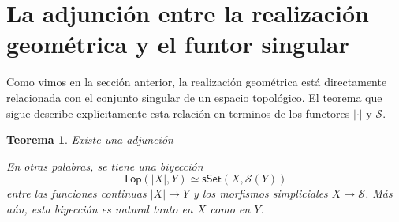 \documentclass[11pt]{report}
\theoremstyle{colored}
\newtheorem{theorem}{Teorema}[section]
\newcommand{\cat}[1]{\mathsf{#1}}
\begin{document}
\section{La adjunción entre la realización geométrica y el funtor singular}

Como vimos en la sección anterior, la realización geométrica está directamente relacionada con el conjunto singular de un espacio topológico. El teorema que sigue describe explícitamente esta relación en terminos de los functores $| \cdot |$ y $\mathcal{S}$.

\begin{theorem} Existe una adjunción
\begin{center}
\end{center}

En otras palabras, se tiene una biyección
\[
\cat{Top}(|X|,Y) \simeq \cat{sSet}(X,\mathcal{S}(Y))
\]
entre las funciones continuas $|X| \to Y$ y los morfismos simpliciales $X \to \mathcal{S}$. Más aún, esta biyección es natural tanto en $X$ como en $Y$.
\end{theorem}
\end{document}
